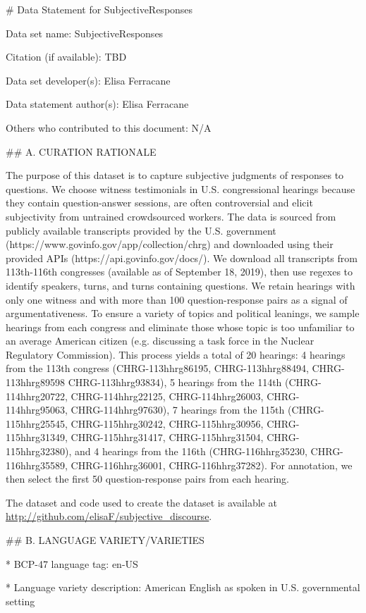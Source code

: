 \# Data Statement for SubjectiveResponses

Data set name: SubjectiveResponses

Citation (if available): TBD

Data set developer(s): Elisa Ferracane

Data statement author(s): Elisa Ferracane

Others who contributed to this document: N/A

\#\# A. CURATION RATIONALE 

The purpose of this dataset is to capture subjective judgments of responses to questions. We choose witness testimonials in U.S. congressional hearings because they contain question-answer sessions, are often controversial and elicit subjectivity from untrained crowdsourced workers. The data is sourced from publicly available transcripts provided by the U.S. government (https://www.govinfo.gov/app/collection/chrg) and downloaded using their provided APIs (https://api.govinfo.gov/docs/). We download all transcripts from 113th-116th congresses (available as of September 18, 2019), then use regexes to identify speakers, turns, and turns containing questions. We retain hearings with only one witness and with more than 100 question-response pairs as a signal of argumentativeness. To ensure a variety of topics and political leanings, we sample hearings from each congress and eliminate those whose topic is too unfamiliar to an average American citizen (e.g. discussing a task force in the Nuclear Regulatory Commission). This process yields a total of 20 hearings: 4 hearings from the 113th congress (CHRG-113hhrg86195, CHRG-113hhrg88494, CHRG-113hhrg89598 CHRG-113hhrg93834), 5 hearings from the 114th (CHRG-114hhrg20722, CHRG-114hhrg22125, CHRG-114hhrg26003, CHRG-114hhrg95063, CHRG-114hhrg97630), 7 hearings from the 115th (CHRG-115hhrg25545, CHRG-115hhrg30242, CHRG-115hhrg30956, CHRG-115hhrg31349, CHRG-115hhrg31417, CHRG-115hhrg31504,  CHRG-115hhrg32380), and 4 hearings from the 116th (CHRG-116hhrg35230, CHRG-116hhrg35589, CHRG-116hhrg36001, CHRG-116hhrg37282). For annotation, we then select the first 50 question-response pairs from each hearing.

The dataset and code used to create the dataset is available at \url{http://github.com/elisaF/subjective_discourse}.

\#\# B. LANGUAGE VARIETY/VARIETIES

* BCP-47 language tag: en-US

* Language variety description: American English as spoken in U.S. governmental setting

